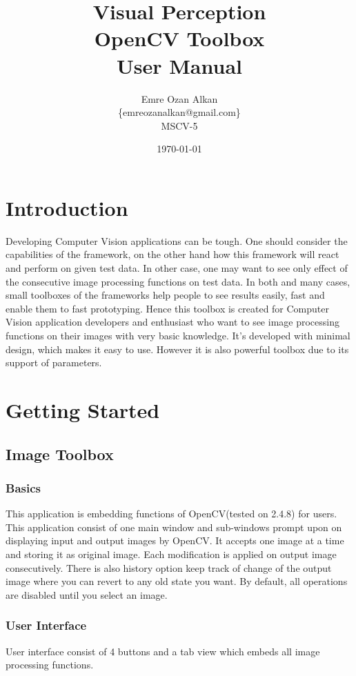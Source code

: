 \documentclass{article}
\title{Visual Perception\\
		OpenCV Toolbox\\
		User Manual}
\author{Emre Ozan Alkan\\
		\{emreozanalkan@gmail.com\}\\
		MSCV-5}
\date{\today}
\begin{document}
\maketitle

\section{Introduction}
	Developing Computer Vision applications can be tough. One should consider the capabilities of the framework, on the other hand how this framework will react and perform on given test data. In other case, one may want to see only effect of the consecutive image processing functions on test data. In both and many cases, small toolboxes of the frameworks help people to see results easily, fast and enable them to fast prototyping. Hence this toolbox is created for Computer Vision application developers and enthusiast who want to see image processing functions on their images with very basic knowledge. It's developed with minimal design, which makes it easy to use. However it is also powerful toolbox due to its support of parameters.
	
	
\section{Getting Started}
	\subsection{Image Toolbox}
	\subsubsection{Basics}
	This application is embedding functions of OpenCV(tested on 2.4.8) for users. This application consist of one main window and sub-windows prompt upon on displaying input and output images by OpenCV. It accepts one image at a time and storing it as original image. Each modification is applied on output image consecutively. There is also history option keep track of change of the output image where you can revert to any old state you want. By default, all operations are disabled until you select an image.
	
	\subsubsection{User Interface}
	User interface consist of 4 buttons and a tab view which embeds all image processing functions. \par
\end{document}
